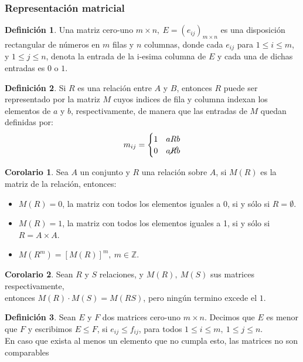\documentclass[10pt]{article}
\theoremstyle{definition}
\newtheorem{definition}{Definición}[section]
\newtheorem{corollary}{Corolario}[theorem]
\begin{document}
\subsubsection{Representación matricial}
\begin{definition}
	Una matriz cero-uno $m\times n,\ E=(e_{ij})_{m\times n}$ es una disposición rectangular de números en $m$ filas y $n$ columnas, donde cada $e_{ij}$ para $1\le i\le m$, y $1\le j\le n$, denota la entrada de la i-esima columna de $E$ y cada una de dichas entradas es $0$ o $1$.
\end{definition}
\begin{definition}
	Si $R$ es una relación entre $A$ y $B$, entonces $R$ puede ser representado por la matriz $M$ cuyos indices de fila y columna indexan los elementos de $a$ y $b$, respectivamente, de manera que las entradas de $M$ quedan definidas por:$$m_{ij}=\begin{cases}1 & aRb\\0 & a\cancel{R}b\end{cases}$$
\end{definition}
\begin{corollary}
	Sea $A$ un conjunto y $R$ una relación sobre $A$, si $M(R)$ es la matriz de la relación, entonces:
	\begin{itemize}
		\item $M(R)=0$, la matriz con todos los elementos iguales a 0, si y sólo si $R=\emptyset$.
		\item $M(R)=1$, la matriz con todos los elementos iguales a 1, si y sólo si $R=A\times A$.
		\item $M(R^m)=[M(R)]^m,\ m\in\mathbb{Z}$.
	\end{itemize}
\end{corollary}
\begin{corollary}
	Sean $R$ y $S$ relaciones, y $M(R),\ M(S)$ sus matrices respectivamente,\\ entonces $M(R)\cdot M(S)=M(RS)$, pero ningún termino excede el $1$.
\end{corollary}
\begin{definition}
	Sean $E$ y $F$ dos matrices cero-uno $m\times n$. Decimos que $E$ es menor que $F$ y escribimos $E\le F$, si $e_{ij}\le f_{ij}$, para todos $1\le i\le m,\ 1\le j\le n$.\\
	En caso que exista al menos un elemento que no cumpla esto, las matrices no son comparables
\end{definition}
\end{document}
